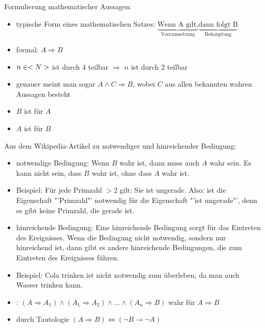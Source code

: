 Formulierung mathematischer Aussagen:
\begin{itemize}
	\item typische Form eines mathematischen Satzes: $\underbrace{\text{Wenn A gilt,}}_\text{Vorraussetzung}\underbrace{\text{dann folgt B}}_\text{Behauptung}$
	\item formal: $A\Rightarrow B$
\end{itemize}

\begin{example}
	\begin{itemize}
		\item $n\in<N>$ ist durch 4 teilbar $\Rightarrow$ $n$ ist durch 2 teilbar
		\item genauer meint man sogar $A\land C\Rightarrow B$, wobei $C$ aus allen bekannten 
		wahren Aussagen besteht
		\item $B$ ist  für $A$
		\item $A$ ist  für $B$
	\end{itemize}
\end{example}

\begin{*anmerkung}
	Aus dem Wikipedia-Artikel zu notwendiger und hinreichender Bedingung:
	\begin{itemize}
		\item notwendige Bedingung: Wenn $B$ wahr ist, dann muss auch $A$ wahr sein. Es kann nicht sein, dass $B$ wahr ist, ohne dass $A$ wahr ist. 
		\item Beispiel: Für jede Primzahl $>2$ gilt: Sie ist ungerade. Also: ist die Eigenschaft "'Primzahl"' 
		notwendig für die Eigenschaft "'ist ungerade"', denn es gibt keine Primzahl, die gerade ist.
		\item hinreichende Bedingung: Eine hinreichende Bedingung sorgt für das Eintreten des Ereignisses. Wenn die Bedingung nicht notwendig, sondern nur hinreichend ist, dann gibt es andere hinreichende Bedingungen, die zum Eintreten des Ereignisses führen.
		\item Beispiel: Cola trinken ist nicht notwendig zum überleben, da man auch Wasser trinken kann.
	\end{itemize}
\end{*anmerkung}

\begin{*definition}
	\begin{itemize}
		\item {}: $(A\Rightarrow A_1)\land(A_1\Rightarrow A_2)\land\dotsc\land(A_n\Rightarrow B)$ wahr für $A\Rightarrow B$
		\item {} durch Tautologie $(A\Rightarrow B)\Leftrightarrow (\neg B\rightarrow \neg A)$
	\end{itemize}
\end{*definition}

